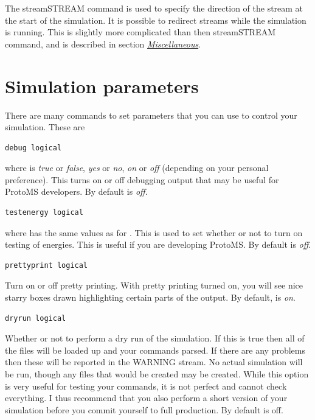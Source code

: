 \documentclass[letterpaper,10pt,english]{sphinxmanual}
\begin{document}
The streamSTREAM command is used to specify the direction of the stream at the start of the simulation. It is possible to redirect streams while the simulation is running. This is slightly more complicated than then streamSTREAM command, and is described in section {\hyperref[protoms:misccmd]{\emph{Miscellaneous}}}.


\section{Simulation parameters}
\label{protoms:parameters}\label{protoms:simulation-parameters}
There are many commands to set parameters that you can use to control your simulation. These are

\begin{Verbatim}[commandchars=\\\{\}]
debug logical
\end{Verbatim}

where  is \emph{true} or \emph{false}, \emph{yes} or \emph{no}, \emph{on} or \emph{off} (depending on your personal preference). This turns
on or off debugging output that may be useful for ProtoMS developers. By default  is \emph{off}.

\begin{Verbatim}[commandchars=\\\{\}]
testenergy logical
\end{Verbatim}

where  has the same values as for . This is used to set whether or not to turn on testing of energies. This is useful if you are developing ProtoMS. By default  is \emph{off}.

\begin{Verbatim}[commandchars=\\\{\}]
prettyprint logical
\end{Verbatim}

Turn on or off pretty printing. With pretty printing turned on, you will see nice starry boxes drawn highlighting certain parts of the output. By default,  is \emph{on}.

\begin{Verbatim}[commandchars=\\\{\}]
dryrun logical
\end{Verbatim}

Whether or not to perform a dry run of the simulation. If this is true then all of the files will be loaded up and your commands parsed. If there are any problems then these will be reported in the WARNING stream. No actual simulation will be run, though any files that would be created may be created. While this option is very useful for testing your commands, it is not perfect and cannot check everything. I thus recommend that you also perform a short version of your simulation before you commit yourself to full production. By default  is off.
\end{document}

